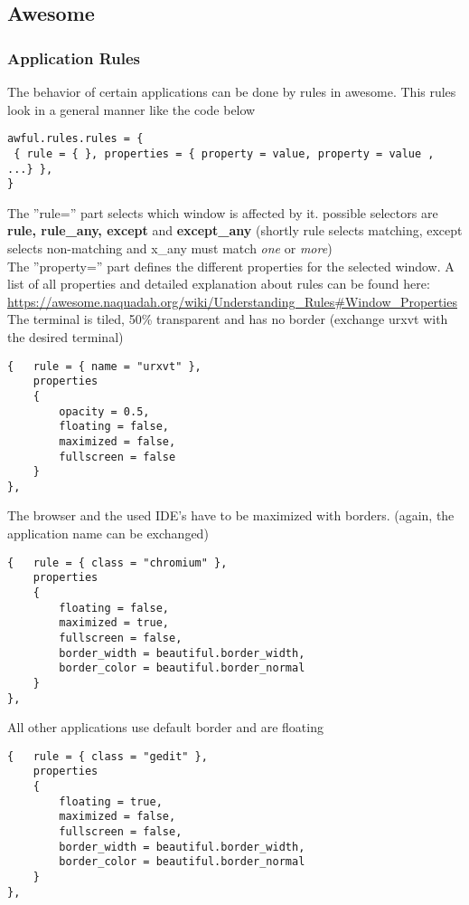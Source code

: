		\subsection{Awesome}
    			\subsubsection{Application Rules}
    				The behavior of certain applications can be done by rules in awesome. This rules look in a general manner like the code below
    				\begin{lstlisting}[caption={example ruling}]
awful.rules.rules = {
 { rule = { }, properties = { property = value, property = value , ...} },
}
    				\end{lstlisting}
    				
    				The ''rule={}'' part selects which window is affected by it. possible selectors are \textbf{rule, rule\_any, except} and \textbf{except\_any} (shortly rule selects matching, except selects non-matching and x\_any must match \textit{one} or \textit{more})\\
    				The ''property={}'' part defines the different properties for the selected window. A list of all properties and detailed explanation about rules can be found here: 
    				\url{https://awesome.naquadah.org/wiki/Understanding_Rules#Window_Properties}\\
    				
\noindent  The terminal is tiled, 50\% transparent and has no border (exchange urxvt with the desired terminal)
				\begin{lstlisting}[caption={ruling for terminals}]
{ 	rule = { name = "urxvt" }, 
	properties 
	{
		opacity = 0.5, 
		floating = false, 
		maximized = false, 
		fullscreen = false 
	}
},
				\end{lstlisting}
				
				The browser and the used IDE's have to be maximized with borders. (again, the application name can be exchanged)
				\begin{lstlisting}[caption={ruling for IDE and browser}]
{ 	rule = { class = "chromium" }, 
	properties 
	{ 
		floating = false,
		maximized = true, 
		fullscreen = false,
		border_width = beautiful.border_width,
		border_color = beautiful.border_normal 
	} 
},
				\end{lstlisting}
				
				All other applications use default border and are floating
				\begin{lstlisting}[caption={ruling for default applications}]
{ 	rule = { class = "gedit" }, 
	properties 
	{ 
		floating = true,
		maximized = false, 
		fullscreen = false,
		border_width = beautiful.border_width,
		border_color = beautiful.border_normal 
	} 
},
				\end{lstlisting}
				
